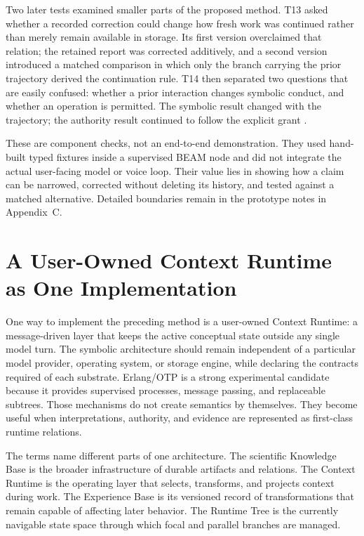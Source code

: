 \documentclass[10pt,a4paper]{article}
\begin{document}
Two later tests examined smaller parts of the proposed method. T13 asked whether a recorded correction could change how fresh work was continued rather than merely remain available in storage. Its first version overclaimed that relation; the retained report was corrected additively, and a second version introduced a matched comparison in which only the branch carrying the prior trajectory derived the continuation rule. T14 then separated two questions that are easily confused: whether a prior interaction changes symbolic conduct, and whether an operation is permitted. The symbolic result changed with the trajectory; the authority result continued to follow the explicit grant \cite{t13v1report,t13v2report,t14report,ctxevolution}.

These are component checks, not an end-to-end demonstration. They used hand-built typed fixtures inside a supervised BEAM node and did not integrate the actual user-facing model or voice loop. Their value lies in showing how a claim can be narrowed, corrected without deleting its history, and tested against a matched alternative. Detailed boundaries remain in the prototype notes in Appendix~C.

\section{A User-Owned Context Runtime as One Implementation}

One way to implement the preceding method is a user-owned Context Runtime: a message-driven layer that keeps the active conceptual state outside any single model turn. The symbolic architecture should remain independent of a particular model provider, operating system, or storage engine, while declaring the contracts required of each substrate. Erlang/OTP is a strong experimental candidate because it provides supervised processes, message passing, and replaceable subtrees. Those mechanisms do not create semantics by themselves. They become useful when interpretations, authority, and evidence are represented as first-class runtime relations.

The terms name different parts of one architecture. The scientific Knowledge Base is the broader infrastructure of durable artifacts and relations. The Context Runtime is the operating layer that selects, transforms, and projects context during work. The Experience Base is its versioned record of transformations that remain capable of affecting later behavior. The Runtime Tree is the currently navigable state space through which focal and parallel branches are managed.
\end{document}
